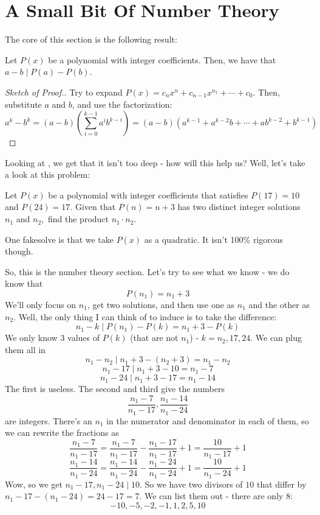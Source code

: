 \documentclass[11pt,titlepage]{scrartcl}
\begin{document}
\section{A Small Bit Of Number Theory}
The core of this section is the following result:
\begin{theorem}\label{poldif}
Let $P(x)$ be a polynomial with integer coefficients. Then, we have that $a-b\mid P(a)-P(b)$.
\end{theorem}
\begin{proof}[Sketch of Proof.]
Try to expand $P(x)=c_nx^n+c_{n-1}x^{n_1}+\cdots+c_0$. Then, substitute $a$ and $b$, and use the factorization:
\[a^k-b^k=(a-b)\left(\sum_{i=0}^{k-1}a^ib^{k-i}\right)=(a-b)(a^{k-1}+a^{k-2}b+\cdots+ab^{k-2}+b^{k-1})\]
\end{proof}
Looking at , we get that it isn't too deep - how will this help us? Well, let's take a look at this problem:
\begin{example}
Let $P(x)$ be a polynomial with integer coefficients that satisfies $P(17)=10$ and $P(24)=17.$ Given that $P(n)=n+3$ has two distinct integer solutions $n_1$ and $n_2,$ find the product $n_1\cdot n_2.$
\end{example}
\begin{remark}
One fakesolve is that we take $P(x)$ as a quadratic. It isn't 100\% rigorous though.
\end{remark}
So, this is the number theory section. Let's try to see what we know - we do know that
\[P(n_1)=n_1+3\]
We'll only focus on $n_1$, get two solutions, and then use one as $n_1$ and the other as $n_2$. Well, the only thing I can think of to induce  is to take the difference:
\[n_1-k\mid P(n_1)-P(k)=n_1+3-P(k)\]
We only know $3$ values of $P(k)$ (that are not $n_1$) - $k=n_2,17,24$. We can plug them all in
\[n_1-n_2\mid n_1+3-(n_2+3)=n_1-n_2\]
\[n_1-17\mid n_1+3-10=n_1-7\]
\[n_1-24\mid n_1+3-17=n_1-14\]
The first is useless. The second and third give the numbers
\[\dfrac{n_1-7}{n_1-17},\dfrac{n_1-14}{n_1-24}\]
are integers. There's an $n_1$ in the numerator and denominator in each of them, so we can rewrite the fractions as
\[\dfrac{n_1-7}{n_1-17}=\dfrac{n_1-7}{n_1-17}-\dfrac{n_1-17}{n_1-17}+1=\dfrac{10}{n_1-17}+1\]
\[\dfrac{n_1-14}{n_1-24}=\dfrac{n_1-14}{n_1-24}-\dfrac{n_1-24}{n_1-24}+1=\dfrac{10}{n_1-24}+1\]
Wow, so we get $n_1-17,n_1-24\mid 10$. So we have two divisors of $10$ that differ by $n_1-17-(n_1-24)=24-17=7$. We can list them out - there are only $8$:
\[-10,-5,-2,-1,1,2,5,10\]
\end{document}
